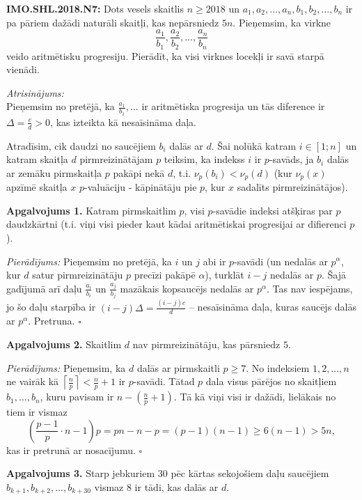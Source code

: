 \documentclass[11pt]{article}
\newenvironment{uzdevums}[1][\unskip]{%
\vspace{3mm}
\noindent
\textbf{#1:}
\noindent}
{}
\begin{document}
\newpage

\begin{uzdevums}[IMO.SHL.2018.N7]
Dots vesels skaitlis $n \geq 2018$ un 
$a_1,a_2,\ldots,a_n,b_1,b_2,\ldots,b_n$
ir pa pāriem dažādi naturāli skaitļi, kas 
nepārsniedz $5n$. Pieņemsim, ka virkne
$$\frac{a_1}{b_1},\frac{a_2}{b_2},\ldots,\frac{a_n}{b_n}$$
veido aritmētisku progresiju. Pierādīt, ka visi virknes locekļi 
ir savā starpā vienādi.
\end{uzdevums}

{\em Atrisinājums:}\\
Pieņemsim no pretējā, ka $\frac{a_1}{b_1},\ldots$ ir aritmētiska
progresija un tās diference ir $\Delta = \frac{c}{d} > 0$, kas
izteikta kā nesaīsināma daļa. 

Atradīsim, cik daudzi no saucējiem $b_i$ dalās ar $d$. 
Šai nolūkā katram $i \in [1;n]$ un katram skaitļa 
$d$ pirmreizinātājam $p$ teiksim, ka indekss $i$ ir 
$p$-savāds, ja $b_i$ dalās ar zemāku pirmskaitļa $p$ 
pakāpi nekā $d$, t.i. $\nu_p(b_i) < \nu_p(d)$
(kur $\nu_p(x)$ apzīmē skaitļa $x$ $p$-valuāciju - kāpinātāju 
pie $p$, kur $x$ sadalīts pirmreizinātājos). 

{\bf Apgalvojums 1.} Katram pirmskaitlim $p$, visi $p$-savādie
indeksi atšķiras par $p$ daudzkārtni (t.i. viņi visi pieder 
kaut kādai aritmētiskai progresijai ar difierenci $p$). 

{\em Pierādījums:} Pieņemsim no pretējā, ka $i$ un $j$ abi ir
$p$-savādi (un nedalās ar $p^{\alpha}$, kur $d$ satur pirmreizinātāju 
$p$ precīzi pakāpē $\alpha$), turklāt $i-j$ nedalās ar $p$.
Šajā gadījumā arī daļu $\frac{a_i}{b_i}$ un $\frac{a_j}{b_j}$
mazākais kopsaucējs nedalās ar $p^{\alpha}$. 
Tas nav iespējams, jo šo daļu starpība ir $(i-j)\Delta = \frac{(i-j)c}{d}$ --
nesaīsināma daļa, kuras saucējs dalās ar $p^{\alpha}$. 
Pretruna. $\square$

{\bf Apgalvojums 2.} Skaitlim $d$ nav pirmreizinātāju, kas 
pārsniedz $5$. 

{\em Pierādījums:} Pieņemsim, ka $d$ dalās ar pirmskaitli $p \geq  7$. 
No indeksiem $1,2,\ldots,n$ ne vairāk kā 
$\left\lceil \frac{n}{p} \right\rceil < \frac{n}{p} + 1$ ir $p$-savādi. 
Tātad $p$ dala visus pārējos no skaitļiem $b_1,\ldots,b_n$, kuru pavisam 
ir $n - \left( \frac{n}{p} + 1 \right)$. Tā kā viņi visi ir dažādi, 
lielākais no tiem ir vismaz
\[ \left( \frac{p-1}{p}\cdot{}n - 1\right)p  = pn-n-p = (p-1)(n-1) 
\geq 6(n-1) > 5n, \]
kas ir pretrunā ar nosacījumu. $\square$

{\bf Apgalvojums 3.} Starp jebkuriem $30$ pēc kārtas sekojošiem daļu 
saucējiem $b_{k+1},b_{k+2},\ldots,b_{k+30}$ vismaz $8$ ir tādi, kas dalās ar $d$. 
\end{document}
